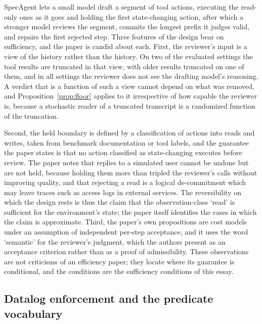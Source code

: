 \documentclass[11pt]{article}
\theoremstyle{definition}
\theoremstyle{remark}
\begin{document}
SpecAgent \cite{specagent} lets a small model draft a segment of tool actions, executing the read-only ones as it goes and holding the first state-changing action, after which a stronger model reviews the segment, commits the longest prefix it judges valid, and repairs the first rejected step. Three features of the design bear on sufficiency, and the paper is candid about each. First, the reviewer's input is a view of the history rather than the history. On two of the evaluated settings the tool results are truncated in that view, with older results truncated on one of them, and in all settings the reviewer does not see the drafting model's reasoning. A verdict that is a function of such a view cannot depend on what was removed, and Proposition~\ref{prop:floor} applies to it irrespective of how capable the reviewer is, because a stochastic reader of a truncated transcript is a randomized function of the truncation.

Second, the held boundary is defined by a classification of actions into reads and writes, taken from benchmark documentation or tool labels, and the guarantee the paper states is that no action classified as state-changing executes before review. The paper notes that replies to a simulated user cannot be undone but are not held, because holding them more than tripled the reviewer's calls without improving quality, and that rejecting a read is a logical de-commitment which may leave traces such as access logs in external services. The reversibility on which the design rests is thus the claim that the observation-class `read' is sufficient for the environment's state; the paper itself identifies the cases in which the claim is approximate. Third, the paper's own propositions are cost models under an assumption of independent per-step acceptance, and it uses the word `semantic' for the reviewer's judgment, which the authors present as an acceptance criterion rather than as a proof of admissibility. These observations are not criticisms of an efficiency paper; they locate where its guarantee is conditional, and the conditions are the sufficiency conditions of this essay.

\subsection{Datalog enforcement and the predicate vocabulary}
\end{document}
